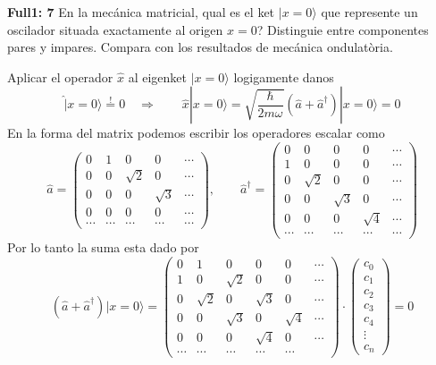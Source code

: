 
\begin{ejercicio}
	\textbf{Full1: 7} En la mecánica matricial, qual es el ket $|x =0 \rangle$ que represente un
oscilador situada exactamente al origen $x=0$? Distinguie entre componentes
pares y impares. Compara con los resultados de mecánica ondulatòria.
\end{ejercicio}
Aplicar el operador $\hat x$ al eigenket $|x=0\rangle$ logigamente danos
$$
	\hat | x=0 \rangle \overset{!}{=} 0 \quad \Rightarrow \qquad \hat x |
x=0\rangle = \sqrt{\frac{\hbar}{2 m\omega}} ( \hat a + \hat a^\dagger) | x = 0 \rangle = 0 
$$
En la forma del matrix podemos escribir los operadores escalar como
$$
	\hat a = \begin{pmatrix} 
	0 & 1 & 0 & 0 & \cdots \\
	0 & 0 & \sqrt 2 & 0 & \cdots \\
	0 & 0 & 0 & \sqrt 3 & \cdots \\
	0 & 0 & 0 & 0 & \cdots\\
	\cdots & \cdots & \cdots & \cdots & \cdots  
	\end{pmatrix}, \qquad \hat a^\dagger = \begin{pmatrix}
	0 & 0 & 0 & 0 & \cdots \\
	1 & 0 & 0 & 0 & \cdots \\
	0 & \sqrt 2 & 0 & 0 & \cdots \\
	0 & 0 & \sqrt 3 & 0 & \cdots \\
	0 & 0 & 0 & \sqrt 4 & \cdots \\
	\cdots & \cdots & \cdots & \cdots & \cdots  
	\end{pmatrix}
$$
Por lo tanto la suma esta dado por
$$
	(\hat a + \hat a^\dagger) |x=0\rangle = \begin{pmatrix}
	0 & 1 & 0 & 0 & 0 & \cdots \\
	1 & 0 & \sqrt 2 & 0 & 0 & \cdots \\
	0 & \sqrt 2 & 0 & \sqrt 3 & 0 & \cdots \\
	0 & 0 & \sqrt 3 & 0 & \sqrt 4 & \cdots \\
	0 & 0 & 0 & \sqrt 4 & 0 & \cdots \\
	\cdots & \cdots & \cdots & \cdots & \cdots  
	\end{pmatrix} \cdot \begin{pmatrix}
	c_0 \\ c_1 \\ c_2 \\ c_3 \\ c_4 \\ \vdots \\ c_n
	\end{pmatrix} = 0
$$
